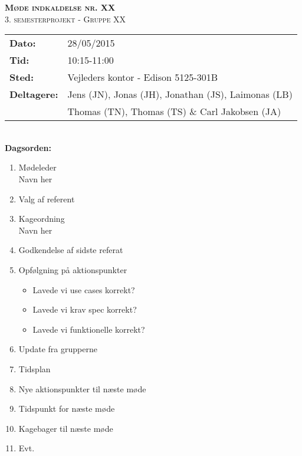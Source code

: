
\newcommand{\HRule}{\rule{\linewidth}{0.1mm}}


	\begin{center}
		{\huge \bfseries \textsc{Møde indkaldelse nr. XX}}\\
		\textsc{\large 3. semesterprojekt - Gruppe XX}\\[0.3cm]
	\end{center}
	\begin{tabular}{ll}
	\large \textbf{Dato:} & 28/05/2015  \\ %
	\large \textbf{Tid:}  & 10:15-11:00 \\ %
	\large \textbf{Sted:} & Vejleders kontor - Edison 5125-301B		\\ %
	\large \textbf{Deltagere:} & Jens (JN), Jonas (JH), Jonathan (JS), Laimonas (LB) \\
	\large \textbf & Thomas (TN),  Thomas (TS) \& Carl Jakobsen (JA)\\
	\end{tabular}\\
	\phantom{\,}\hspace{0.1em} \large \textbf{Dagsorden:}
	\begin{enumerate}
		\itemsep 0.3em 
		\item Mødeleder\\
			Navn her
		\item Valg af referent
		\item Kageordning\\
			Navn her
		\item Godkendelse af sidste referat
		\item Opfølgning på aktionspunkter
		\begin{itemize}
			\itemsep 0.3em 
			\item Lavede vi use cases korrekt?
			\item Lavede vi krav spec korrekt?
			\item Lavede vi funktionelle korrekt?
		\end{itemize}
		\item Update fra grupperne
		\item Tidsplan
		\item Nye aktionspunkter til næste møde
		\item Tidspunkt for næste møde
		\item Kagebager til næste møde
		\item Evt.
	\end{enumerate}
